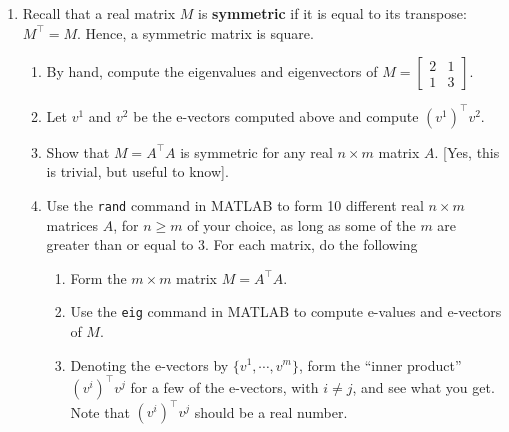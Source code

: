 \documentclass[letterpaper]{article}
\begin{document}
\begin{enumerate}
\begin{enumerate}
    \item Suppose that $K$ is an $n \times m$ real matrix and $Q$ is a square $n \times n $ matrix. Let $k^i$ be the $i$-th column of $K$. Compute $$\mathrm{tr}(K^\top Q K)$$
        where $K^\top$ denotes the transpose of $K$.

\end{enumerate}

\item Recall that a real matrix $M$ is \textbf{symmetric} if it is equal to its transpose: $M^\top=M$. Hence, a symmetric matrix is square.

\begin{enumerate}
\setlength{\itemsep}{.1in}
\renewcommand{\labelenumi}{(\alph{enumi})}

\item By hand, compute the eigenvalues and eigenvectors of $M=\left[  \begin{array}{cc} 2 & 1 \\ 1 & 3 \end{array}\right]$.

\item Let $v^1$ and $v^2$ be the e-vectors computed above and compute $(v^1)^\top v^2$.

\item Show that $M=A^\top A$ is symmetric for any real $n \times m$ matrix $A$. [Yes, this is trivial, but useful to know].

\item Use the \texttt{rand} command in MATLAB to form 10 different real $n \times m$ matrices $A$, for $n \ge m$ of your choice, as long as some of the $m$ are greater than or equal to 3. For each matrix, do the following

    \begin{enumerate}
\setlength{\itemsep}{.1in}
\renewcommand{\labelenumi}{(\alph{enumi})}

\item Form the $m\times m$ matrix $M=A^\top A$.

\item Use the \texttt{eig} command in MATLAB to compute e-values and e-vectors of $M$.

\item Denoting the e-vectors by $\{ v^1, \cdots, v^m \}$,  form the ``inner product'' $(v^i)^\top v^j$ for a few of the e-vectors, with $i \not = j$, and see what you get. Note that $(v^i)^\top v^j$ should be a real number.


\end{enumerate}
\end{enumerate}
\end{enumerate}
\end{document}
